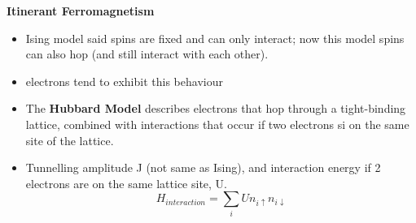 \textbf{Itinerant Ferromagnetism}
\begin{itemize}
    \item Ising model said spins are fixed and can only interact; now this model spins can also hop (and still interact with each other).
    \item electrons tend to exhibit this behaviour
    \item The \textbf{Hubbard Model} describes electrons that hop through a tight-binding lattice, combined with interactions that occur if two electrons si on the same site of the lattice.
    \item Tunnelling amplitude J (not same as Ising), and interaction energy if 2 electrons are on the same lattice site, U.
    \[H_{interaction} = \sum_i U n_{i\uparrow} n_{i\downarrow}\]
\end{itemize}

